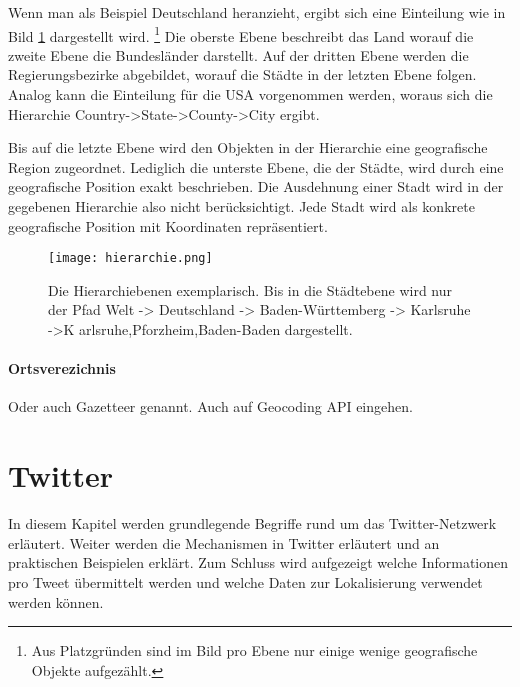 		Wenn man als Beispiel Deutschland heranzieht, ergibt sich eine Einteilung wie in Bild \ref{img:hierarchy} dargestellt wird. \footnote{Aus Platzgründen sind im Bild pro Ebene nur einige wenige geografische Objekte aufgezählt.} 
		Die oberste Ebene beschreibt das Land worauf die zweite Ebene die Bundesländer darstellt.
		Auf der dritten Ebene werden die Regierungsbezirke abgebildet, worauf die Städte in der letzten Ebene folgen. 
		Analog kann die Einteilung für die USA vorgenommen werden, woraus sich die Hierarchie Country->State->County->City ergibt.

		Bis auf die letzte Ebene wird den Objekten in der Hierarchie eine geografische Region zugeordnet. 
		Lediglich die unterste Ebene, die der Städte, wird durch eine geografische Position exakt beschrieben. 
		Die Ausdehnung einer Stadt wird in der gegebenen Hierarchie also nicht berücksichtigt. 
		Jede Stadt wird als konkrete geografische Position mit Koordinaten repräsentiert. 

		\begin{figure}[h!]
		\begin{center}
		\texttt{[image: hierarchie.png]}
		\caption{Die Hierarchiebenen exemplarisch. Bis in die Städtebene wird nur der Pfad Welt -> Deutschland -> Baden-Württemberg -> Karlsruhe ->K arlsruhe,Pforzheim,Baden-Baden dargestellt.}
		\label{img:hierarchy}
		\end{center}
		\end{figure}	

		\paragraph*{Ortsverezichnis}
		Oder auch Gazetteer genannt. Auch auf Geocoding API eingehen. 	  




	\section{Twitter} 
	In diesem Kapitel werden grundlegende Begriffe rund um das Twitter-Netzwerk erläutert. 
	Weiter werden die Mechanismen in Twitter erläutert und an praktischen Beispielen erklärt. 
	Zum Schluss wird aufgezeigt welche Informationen pro Tweet übermittelt werden und welche Daten zur Lokalisierung verwendet werden können.

